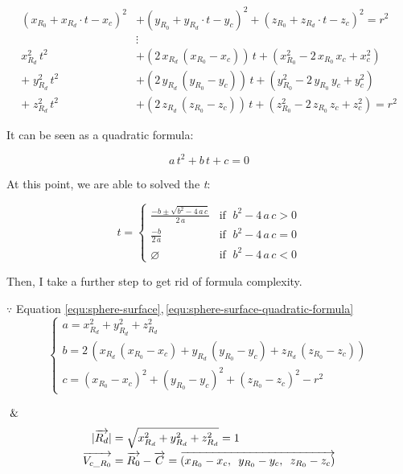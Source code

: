 \[
\begin{aligned}
(x_{R_0} + x_{R_d} \cdot t - x_c)^2 &+ (y_{R_0} + y_{R_d} \cdot t - y_c)^2 + (z_{R_0} + z_{R_d} \cdot t - z_c)^2 = r^2 \\
&\vdots \\
x_{R_d}^2\,t^2 &+ (2\,x_{R_d}\,(x_{R_0} - x_c))\,t + (x_{R_0}^2 - 2\,x_{R_0}\,x_c + x_c^2) \\
+\;y_{R_d}^2\,t^2 &+ (2\,y_{R_d}\,(y_{R_0} - y_c))\,t + (y_{R_0}^2 - 2\,y_{R_0}\,y_c + y_c^2) \\
+\;z_{R_d}^2\,t^2 &+ (2\,z_{R_d}\,(z_{R_0} - z_c))\,t + (z_{R_0}^2 - 2\,z_{R_0}\,z_c + z_c^2) = r^2
\end{aligned}
\]

It can be seen as a quadratic formula:

\begin{equation}\label{equ:sphere-surface-quadratic-formula}
a\,t^2 + b\,t + c = 0
\end{equation}

At this point, we are able to solved the \emph{t}:

\[
t =
\begin{cases}
\frac{-b \pm \sqrt{b^2 - 4\,a\,c}}{2\,a} & \text{if }\;b^2 - 4\,a\,c > 0 \\
\frac{-b}{2\,a} & \text{if }\; b^2 - 4\,a\,c = 0 \\
\varnothing & \text{if }\; b^2 - 4\,a\,c < 0
\end{cases}
\]

Then, I take a further step to get rid of formula complexity.

$\because$ Equation \ref{equ:sphere-surface},\,\ref{equ:sphere-surface-quadratic-formula}
\[
\left\{
\begin{array}{lr}
a = x_{R_d}^2 + y_{R_d}^2 + z_{R_d}^2 \\
b = 2\,(x_{R_d}\,(x_{R_0} - x_c) + y_{R_d}\,(y_{R_0} - y_c) + z_{R_d}\,(z_{R_0} - z_c)) \\
c = (x_{R_0} - x_c)^2 + (y_{R_0} - y_c)^2 + (z_{R_0} - z_c)^2 - r^2
\end{array}
\right.
\]

$\And$
\[
\begin{array}{lr}
\begin{aligned}
\lvert \overrightarrow{R_d} \rvert &= \sqrt{x_{R_d}^2 + y_{R_d}^2 + z_{R_d}^2} = 1 \\
\overrightarrow{V_{c\_R_0}} &= \overrightarrow{R_0} - \overrightarrow{C} = \overrightarrow{(x_{R_0} - x_c,\enspace y_{R_0} - y_c,\enspace z_{R_0} - z_c)}
\end{aligned}
\end{array}
\]

